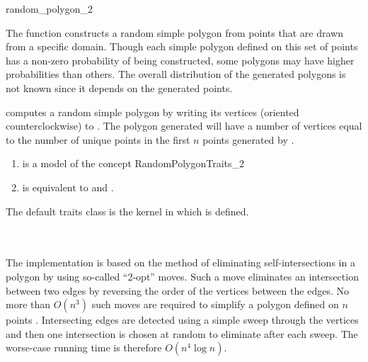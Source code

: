 
\begin{ccRefFunction}{random_polygon_2}

\ccDefinition

The function \ccRefName constructs a random simple polygon 
from points that are drawn from a specific domain.
Though each simple polygon defined on this set of 
points has a non-zero probability of being constructed, some polygons may 
have higher probabilities than others.  The overall distribution of the
generated polygons is not known since it depends on the generated points.



{
computes a random simple polygon by writing its vertices (oriented
counterclockwise) to . The polygon generated will have a number
of vertices equal to the number of unique points in the first $n$ points
generated by . 
}

\ccRequirements
\begin{enumerate}
\item {} is a model of the concept RandomPolygonTraits\_2
\item {} is equivalent to
       and .
\end{enumerate}

The default traits class  is the kernel in which
 is defined.%

\ccSeeAlso 
{} \\
 \\

\ccImplementation 
The implementation is based on the method of eliminating self-intersections in
a polygon by using so-called ``2-opt'' moves.  Such a move eliminates an 
intersection between two edges by reversing the order of the vertices between 
the edges.  No more than $O(n^3)$ such moves are required to simplify a polygon
defined on $n$ points \cite{ls-utstp-82}.
Intersecting edges are detected using a simple sweep through the vertices
and then one intersection is chosen at random to eliminate after each sweep. 
The worse-case running time is therefore $O(n^4 \log n)$.


\end{ccRefFunction}
